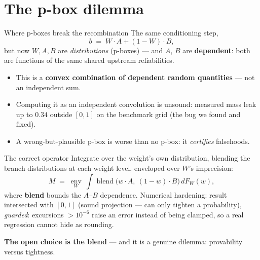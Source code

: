 \documentclass[aspectratio=169,11pt]{beamer}
\newcommand{\bad}[1]{\textcolor{ipared}{#1}}
\begin{document}
\section{The p-box dilemma}

\begin{frame}{Where p-boxes break the recombination}
The same conditioning step,
\[ b \;=\; W\cdot A + (1-W)\cdot B, \]
but now $W,A,B$ are \emph{distributions} (p-boxes) --- and $A$, $B$ are \textbf{dependent}: both are
functions of the same shared upstream reliabilities.
\medskip
\begin{itemize}
\item This is a \textbf{convex combination of dependent random quantities} --- not an independent sum.
\item Computing it as an independent convolution is \bad{unsound}: measured mass leak up to
  \bad{$0.34$} outside $[0,1]$ on the benchmark grid (the bug we found and fixed).
\item A wrong-but-plausible p-box is worse than no p-box: it \emph{certifies} falsehoods.
\end{itemize}
\end{frame}

\begin{frame}{The correct operator}
Integrate over the weight's own distribution, blending the branch distributions at each weight level,
enveloped over $W$'s imprecision:
\[
M \;=\; \operatorname*{env}_{W}\ \int \operatorname{blend}\bigl(w\!\cdot\! A,\ (1{-}w)\!\cdot\! B\bigr)\, dF_W(w),
\]
where \textbf{blend} bounds the $A$--$B$ dependence. Numerical hardening: result intersected with
$[0,1]$ (sound projection --- can only tighten a probability), \emph{guarded}: excursions $>10^{-6}$
raise an error instead of being clamped, so a real regression cannot hide as rounding.
\medskip

\textbf{The open choice is the blend} --- and it is a genuine dilemma:
provability versus tightness.
\end{frame}
\end{document}
